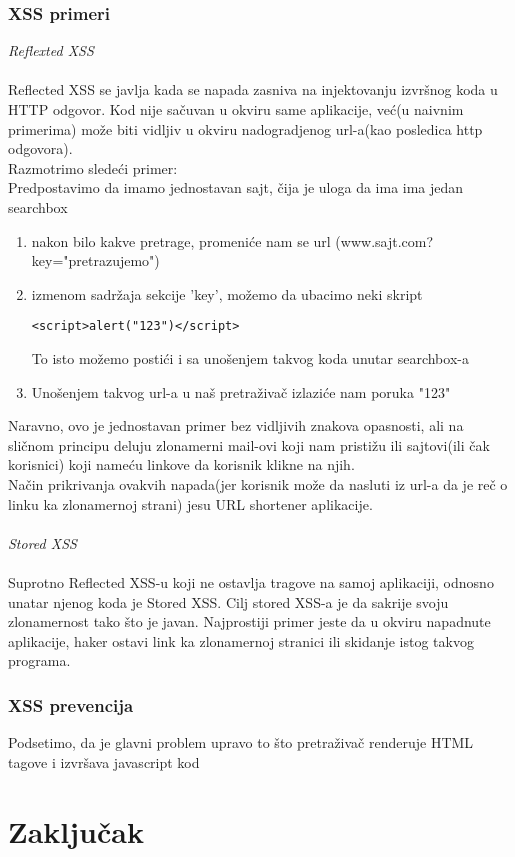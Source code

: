 \documentclass[a4paper]{article}
\begin{document}
\subsubsection{XSS primeri}
\textit{Reflexted XSS}\\\\
Reflected XSS se javlja kada se napada zasniva na injektovanju izvr\v{s}nog koda u HTTP odgovor. Kod nije sa\v{c}uvan u okviru same aplikacije, ve\'{c}(u naivnim primerima) mo\v{z}e biti vidljiv u okviru nadogradjenog url-a(kao posledica http odgovora).\\
Razmotrimo slede\'{c}i primer:\\
Predpostavimo da imamo jednostavan sajt, \v{c}ija je uloga da ima ima jedan searchbox
\begin{enumerate}
\item nakon bilo kakve pretrage, promeni\'{c}e nam se url (www.sajt.com?key="pretrazujemo")
\item izmenom sadr\v{z}aja sekcije 'key', mo\v{z}emo da ubacimo neki skript
\begin{lstlisting}
<script>alert("123")</script>
\end{lstlisting}
To isto mo\v{z}emo posti\'{c}i i sa uno\v{s}enjem takvog koda unutar searchbox-a
\item Uno\v{s}enjem takvog url-a u na\v{s} pretra\v{z}iva\v{c} izlazi\'{c}e nam poruka "123"

\end{enumerate}
Naravno, ovo je jednostavan primer bez vidljivih znakova opasnosti, ali na sli\v{c}nom principu deluju zlonamerni mail-ovi koji nam pristi\v{z}u ili sajtovi(ili \v{c}ak korisnici) koji name\'{c}u linkove da korisnik klikne na njih.\\
Na\v{c}in prikrivanja ovakvih napada(jer korisnik mo\v{z}e da nasluti iz url-a da je re\v{c} o linku ka zlonamernoj strani) jesu URL shortener aplikacije.\\\\
\textit{Stored XSS}\\\\
Suprotno Reflected XSS-u koji ne ostavlja tragove na samoj aplikaciji, odnosno unatar njenog koda je Stored XSS. Cilj stored XSS-a je da sakrije svoju zlonamernost tako \v{s}to je javan. Najprostiji primer jeste da u okviru napadnute aplikacije, haker ostavi link ka zlonamernoj stranici ili skidanje istog takvog programa.
\subsubsection{XSS prevencija}
Podsetimo, da je glavni problem upravo to \v{s}to pretra\v{z}iva\v{c} renderuje HTML tagove i izvr\v{s}ava javascript kod  
\section{Zaključak}

\appendix


\end{document}
